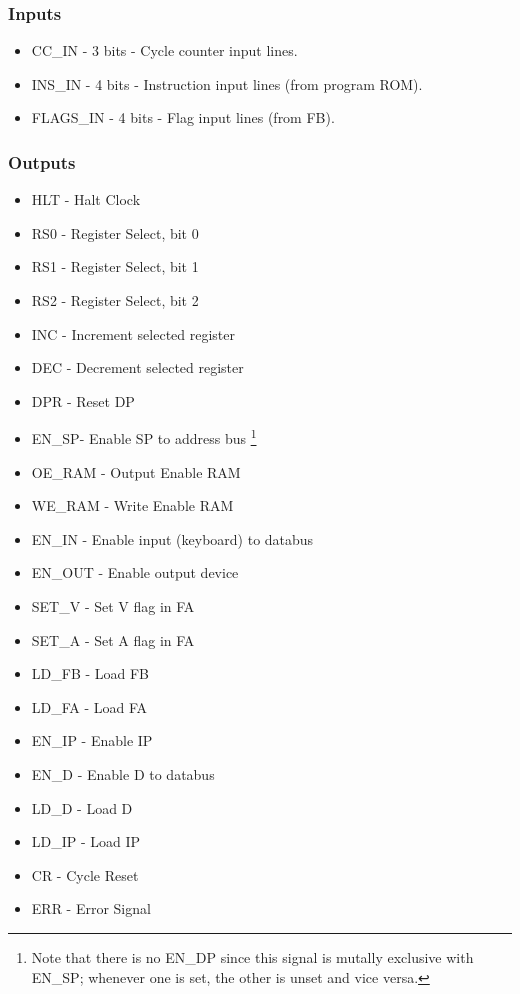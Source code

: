 \subsubsection*{Inputs}
\begin{itemize}
\itemsep0em
\item CC\_IN - 3 bits - Cycle counter input lines.
\item INS\_IN - 4 bits - Instruction input lines (from program ROM).
\item FLAGS\_IN - 4 bits - Flag input lines (from FB).
\end{itemize}

\subsubsection*{Outputs}
\begin{itemize}
\itemsep0em 
\item HLT - Halt Clock
\item RS0 - Register Select, bit 0
\item RS1 - Register Select, bit 1
\item RS2 - Register Select, bit 2
\item INC - Increment selected register
\item DEC - Decrement selected register
\item DPR - Reset DP
\item EN\_SP- Enable SP to address bus \footnote{Note that there is no EN\_DP since this signal is mutally exclusive with EN\_SP; whenever one is set, the other is unset and vice versa.}
\item OE\_RAM - Output Enable RAM
\item WE\_RAM - Write Enable RAM
\item EN\_IN - Enable input (keyboard) to databus
\item EN\_OUT - Enable output device
\item SET\_V - Set V flag in FA
\item SET\_A - Set A flag in FA
\item LD\_FB - Load FB
\item LD\_FA - Load FA
\item EN\_IP - Enable IP
\item EN\_D - Enable D to databus
\item LD\_D - Load D
\item LD\_IP - Load IP
\item CR - Cycle Reset
\item ERR - Error Signal
\end{itemize}


